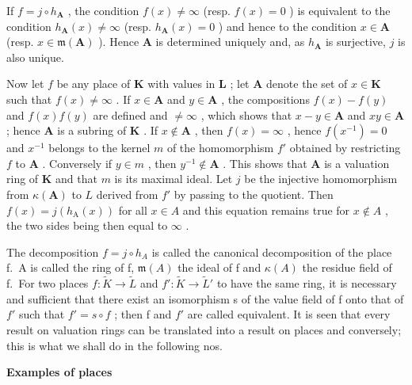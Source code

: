 If \(f = j \circ h_{\mathbf{A}}\) , the condition \(f(x) \neq \infty\) (resp. \(f(x) = 0\) ) is equivalent to the condition \(h_{\mathbf{A}}(x) \neq \infty\) (resp. \(h_{\mathbf{A}}(x) = 0\) ) and hence to the condition \(x \in \mathbf{A}\) (resp. \(x \in \mathfrak{m}(\mathbf{A})\) ). Hence \(\mathbf{A}\) is determined uniquely and, as \(h_{\mathbf{A}}\) is surjective, \(j\) is also unique.

Now let \(f\) be any place of \(\mathbf{K}\) with values in \(\mathbf{L}\) ; let \(\mathbf{A}\) denote the set of \(x \in \mathbf{K}\) such that \(f(x) \neq \infty\) . If \(x \in \mathbf{A}\) and \(y \in \mathbf{A}\) , the compositions \(f(x) - f(y)\) and \(f(x)f(y)\) are defined and \(\neq \infty\) , which shows that \(x - y \in \mathbf{A}\) and \(xy \in \mathbf{A}\) ; hence \(\mathbf{A}\) is a subring of \(\mathbf{K}\) . If \(x \notin \mathbf{A}\) , then \(f(x) = \infty\) , hence \(f(x^{-1}) = 0\) and \(x^{-1}\) belongs to the kernel \(m\) of the homomorphism \(f'\) obtained by restricting \(f\) to \(\mathbf{A}\) . Conversely if \(y \in m\) , then \(y^{-1} \notin \mathbf{A}\) . This shows that \(\mathbf{A}\) is a valuation ring of \(\mathbf{K}\) and that \(m\) is its maximal ideal. Let \(j\) be the injective homomorphism from \(\kappa(\mathbf{A})\) to \(L\) derived from \(f'\) by passing to the quotient. Then \(f(x) = j(h_{\mathrm{A}}(x))\) for all \(x \in A\) and this equation remains true for \(x \notin A\) , the two sides being then equal to \(\infty\) .

The decomposition \(f = j \circ h_{A}\) is called the canonical decomposition of the place f.~A is called the ring of f, \(\mathfrak{m}(A)\) the ideal of f and \(\kappa(A)\) the residue field of f.~For two places \(f: \tilde{K} \to \tilde{L}\) and \(f': \tilde{K} \to \tilde{L}'\) to have the same ring, it is necessary and sufficient that there exist an isomorphism s of the value field of f onto that of \(f'\) such that \(f' = s \circ f\) ; then f and \(f'\) are called equivalent. It is seen that every result on valuation rings can be translated into a result on places and conversely; this is what we shall do in the following nos.

\textbf{Examples of places}\par

